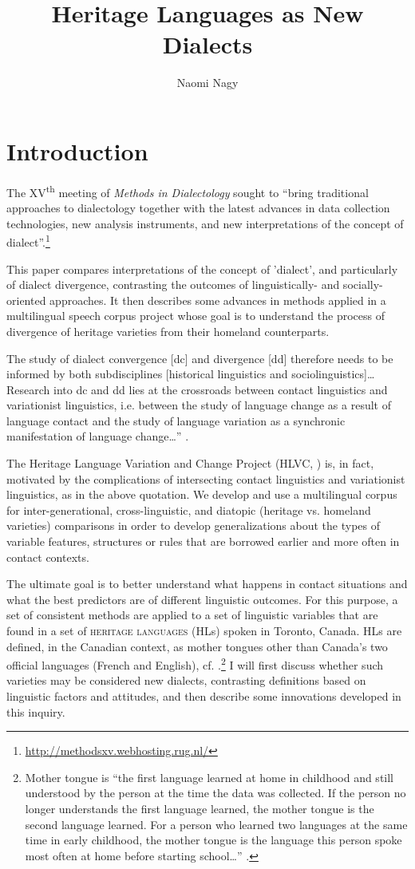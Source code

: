 \documentclass[output=paper]{LSP/langsci}
\author{Naomi Nagy\affiliation{University of Toronto, Department of Linguistics }}
\title{Heritage Languages as New Dialects}
\begin{document}

\section{Introduction}
The XV\textsuperscript{th} meeting of \textit{Methods in Dialectology} sought to “bring traditional approaches to dialectology together with the latest advances in data collection technologies, new analysis instruments, and new interpretations of the concept of dialect”.\footnote{\url{http://methodsxv.webhosting.rug.nl/}}

This paper compares interpretations of the concept of 'dialect', and particularly of dialect divergence, contrasting the outcomes of linguistically- and socially-oriented approaches. It then describes some advances in methods applied in a multilingual speech corpus project whose goal is to understand the process of divergence of heritage varieties from their homeland counterparts.

The study of dialect convergence [dc] and divergence [dd] therefore needs to be informed by both subdisciplines [historical linguistics and sociolinguistics]… Research into dc and dd lies at the crossroads between contact linguistics and variationist linguistics, i.e. between the study of language change as a result of language contact and the study of language variation as a synchronic manifestation of language change…” \citep[16]{auer_study_2004}.

The Heritage Language Variation and Change Project (HLVC, \citealt{nagy_multilingual_2011}) is, in fact, motivated by the complications of intersecting contact linguistics and variationist linguistics, as in the above quotation. We develop and use a multilingual corpus for inter-generational, cross-linguistic, and diatopic (heritage vs. homeland varieties) comparisons in order to develop generalizations about the types of variable features, structures or rules that are borrowed earlier and more often in contact contexts.  

The ultimate goal is to better understand what happens in contact situations and what the best predictors are of different linguistic outcomes. For this purpose, a set of consistent methods are applied to a set of linguistic variables that are found in a set of \textsc{heritage languages} (HLs) spoken in Toronto, Canada. HLs are defined, in the Canadian context, as mother tongues other than Canada’s two official languages (French and English), cf. \citet{cummins_lifting_1990}.\footnote{Mother tongue is “the first language learned at home in childhood and still understood by the person at the time the data was collected. If the person no longer understands the first language learned, the mother tongue is the second language learned. For a person who learned two languages at the same time in early childhood, the mother tongue is the language this person spoke most often at home before starting school…” \citep{statistics_canada_mother_2014}.} I will first discuss whether such varieties may be considered new dialects, contrasting definitions based on linguistic factors and attitudes, and then describe some innovations developed in this inquiry.
\end{document}
